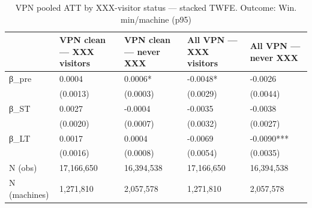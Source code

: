 \begin{table}

\caption{VPN pooled ATT by XXX-visitor status — stacked TWFE. Outcome: Win. min/machine (p95)}
\centering
\begin{tabular}[t]{lllll}
\toprule
  & VPN clean — XXX visitors & VPN clean — never XXX & All VPN — XXX visitors & All VPN — never XXX\\
\midrule
β\_pre & 0.0004 & 0.0006* & -0.0048* & -0.0026\\
 & (0.0013) & (0.0003) & (0.0029) & (0.0044)\\
β\_ST & 0.0027 & -0.0004 & -0.0035 & -0.0038\\
 & (0.0020) & (0.0007) & (0.0032) & (0.0027)\\
β\_LT & 0.0017 & 0.0004 & -0.0069 & -0.0090***\\
\addlinespace
 & (0.0016) & (0.0008) & (0.0054) & (0.0035)\\
N (obs) & 17,166,650 & 16,394,538 & 17,166,650 & 16,394,538\\
N (machines) & 1,271,810 & 2,057,578 & 1,271,810 & 2,057,578\\
\bottomrule
\end{tabular}
\end{table}
